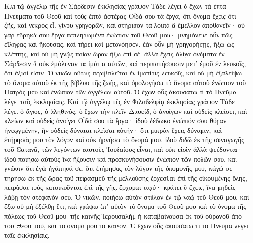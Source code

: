 \begin{pages}
    \begin{Rightside}
        \beginnumbering
		\renewcommand{\LettrineFontHook}{\PHtitl}
		\lettrine[lines=3]{Κ}{αὶ} τῷ ἀγγέλῳ τῆς ἐν Σάρδεσιν ἐκκλησίας γράψον  Τάδε λέγει ὁ ἔχων τὰ ἑπτὰ Πνεύματα τοῦ Θεοῦ καὶ τοὺς ἑπτὰ ἀστέρας Οἶδά σου τὰ ἔργα, ὅτι ὄνομα ἔχεις ὅτι ζῇς, καὶ νεκρὸς εἶ. γίνου γρηγορῶν, καὶ στήρισον τὰ λοιπὰ ἃ ἔμελλον ἀποθανεῖν· οὐ γὰρ εὕρηκά σου ἔργα πεπληρωμένα ἐνώπιον τοῦ Θεοῦ μου· μνημόνευε οὖν πῶς εἴληφας καὶ ἤκουσας, καὶ τήρει καὶ μετανόησον. ἐὰν οὖν μὴ γρηγορήσῃς, ἥξω ὡς κλέπτης, καὶ οὐ μὴ γνῷς ποίαν ὥραν ἥξω ἐπὶ σέ.
		\pend
		\pstart
		ἀλλὰ ἔχεις ὀλίγα ὀνόματα ἐν Σάρδεσιν ἃ οὐκ ἐμόλυναν τὰ ἱμάτια αὐτῶν, καὶ περιπατήσουσιν μετ’ ἐμοῦ ἐν λευκοῖς, ὅτι ἄξιοί εἰσιν. Ὁ νικῶν οὕτως περιβαλεῖται ἐν ἱματίοις λευκοῖς, καὶ οὐ μὴ ἐξαλείψω τὸ ὄνομα αὐτοῦ ἐκ τῆς βίβλου τῆς ζωῆς, καὶ ὁμολογήσω τὸ ὄνομα αὐτοῦ ἐνώπιον τοῦ Πατρός μου καὶ ἐνώπιον τῶν ἀγγέλων αὐτοῦ. Ὁ ἔχων οὖς ἀκουσάτω τί τὸ Πνεῦμα λέγει ταῖς ἐκκλησίαις.
		\pend
		\pstart
		Καὶ τῷ ἀγγέλῳ τῆς ἐν Φιλαδελφίᾳ ἐκκλησίας γράψον Τάδε λέγει ὁ ἅγιος, ὁ ἀληθινός, ὁ ἔχων τὴν κλεῖν Δαυείδ, ὁ ἀνοίγων καὶ οὐδεὶς κλείσει, καὶ κλείων καὶ οὐδεὶς ἀνοίγει Οἶδά σου τὰ ἔργα· ἰδοὺ δέδωκα ἐνώπιόν σου θύραν ἠνεῳγμένην, ἣν οὐδεὶς δύναται κλεῖσαι αὐτήν· ὅτι μικρὰν ἔχεις δύναμιν, καὶ ἐτήρησάς μου τὸν λόγον καὶ οὐκ ἠρνήσω τὸ ὄνομά μου. ἰδοὺ διδῶ ἐκ τῆς συναγωγῆς τοῦ Σατανᾶ, τῶν λεγόντων ἑαυτοὺς Ἰουδαίους εἶναι, καὶ οὐκ εἰσὶν ἀλλὰ ψεύδονται· ἰδοὺ ποιήσω αὐτοὺς ἵνα ἥξουσιν καὶ προσκυνήσουσιν ἐνώπιον τῶν ποδῶν σου, καὶ γνῶσιν ὅτι ἐγὼ ἠγάπησά σε. ὅτι ἐτήρησας τὸν λόγον τῆς ὑπομονῆς μου, κἀγώ σε τηρήσω ἐκ τῆς ὥρας τοῦ πειρασμοῦ τῆς μελλούσης ἔρχεσθαι ἐπὶ τῆς οἰκουμένης ὅλης, πειράσαι τοὺς κατοικοῦντας ἐπὶ τῆς γῆς. ἔρχομαι ταχύ· κράτει ὃ ἔχεις, ἵνα μηδεὶς λάβῃ τὸν στέφανόν σου. Ὁ νικῶν, ποιήσω αὐτὸν στῦλον ἐν τῷ ναῷ τοῦ Θεοῦ μου, καὶ ἔξω οὐ μὴ ἐξέλθῃ ἔτι, καὶ γράψω ἐπ’ αὐτὸν τὸ ὄνομα τοῦ Θεοῦ μου καὶ τὸ ὄνομα τῆς πόλεως τοῦ Θεοῦ μου, τῆς καινῆς Ἱερουσαλὴμ ἡ καταβαίνουσα ἐκ τοῦ οὐρανοῦ ἀπὸ τοῦ Θεοῦ μου, καὶ τὸ ὄνομά μου τὸ καινόν. Ὁ ἔχων οὖς ἀκουσάτω τί τὸ Πνεῦμα λέγει ταῖς ἐκκλησίαις.
		\pend
		\pstart

\end{Rightside}
\end{pages}

